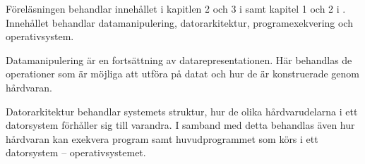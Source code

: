 Föreläsningen behandlar innehållet i kapitlen 2 och 
3 i  \cite{Brookshear2012csa} samt kapitel 1 och 
2 i  
\cite{Silberschatz2013osc,Silberschatz2013intl}.
Innehållet behandlar datamanipulering, datorarkitektur, programexekvering och 
operativsystem.

Datamanipulering är en fortsättning av datarepresentationen.
Här behandlas de operationer som är möjliga att utföra på datat och hur de är 
konstruerade genom hårdvaran.

Datorarkitektur behandlar systemets struktur, hur de olika hårdvarudelarna 
i ett datorsystem förhåller sig till varandra.
I samband med detta behandlas även hur hårdvaran kan exekvera program samt 
huvudprogrammet som körs i ett datorsystem -- operativsystemet.
